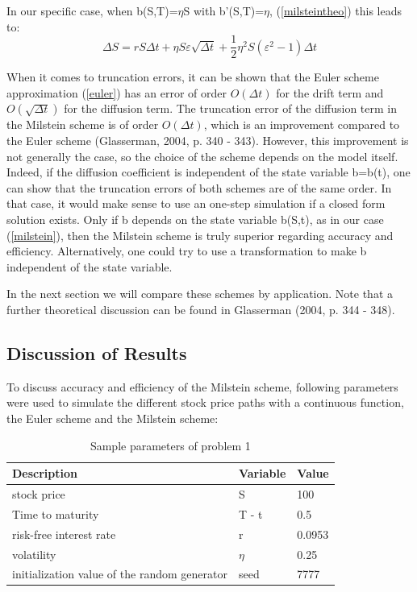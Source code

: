 \documentclass[a4paper,11pt]{article}
\begin{document}
In our specific case, when b(S,T)=$\eta$S with b'(S,T)=$\eta$, (\ref{milsteintheo}) this leads to:
\begin{equation}
\Delta S = rS \Delta t + \eta S \varepsilon \sqrt{\Delta t} + \frac{1}{2} \eta^2 S(\varepsilon^2 - 1) \Delta t
\label{milstein}
\end{equation}

When it comes to truncation errors, it can be shown that the Euler scheme approximation (\ref{euler}) has an error of order $O(\Delta t)$  for the drift term and $O(\sqrt{\Delta t})$ for the diffusion term. The truncation error of the diffusion term in the Milstein scheme is of order $O(\Delta t)$, which is an improvement compared to the Euler scheme (Glasserman, 2004, p. 340 - 343).
However, this improvement is not generally the case, so the choice of the scheme depends on the model itself. Indeed, if the diffusion coefficient is independent of the state variable b=b(t), one can show that the truncation errors of both schemes are of the same order. In that case, it would make sense to use an one-step simulation if a closed form solution exists. Only if b depends on the state variable b(S,t), as in our case (\ref{milstein}), then the Milstein scheme is truly superior regarding accuracy and efficiency. Alternatively, one could try to use a transformation to make b independent of the state variable.

In the next section we will compare these schemes by application. Note that a further theoretical discussion can be found in Glasserman (2004, p. 344 - 348).
\subsection{Discussion of Results}
To discuss accuracy and efficiency of the Milstein scheme, following parameters were used to simulate the different stock price paths with a continuous function, the Euler scheme and the Milstein scheme:

\begin{table}[!h]
\centering
\caption{Sample parameters of problem 1}
\begin{tabular}{l|l|l}
\textbf{Description} & \textbf{Variable} & \textbf{Value}  \\\hline
 stock price& S  & 100  \\
 Time to maturity& T - t  & 0.5 \\
 risk-free interest rate& r & 0.0953 \\
 volatility& $\eta$ & 0.25\\
 initialization value of the random generator & seed& 7777
\end{tabular}
\end{table}
\end{document}
